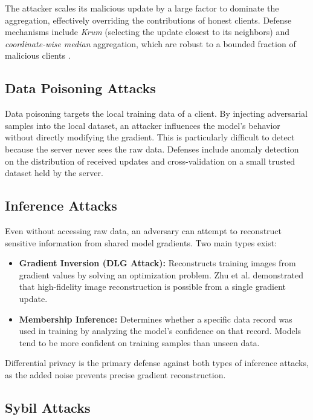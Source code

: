 \documentclass[conference]{IEEEtran}
\begin{document}
The attacker scales its malicious update by a large factor to dominate the aggregation, effectively overriding the contributions of honest clients. Defense mechanisms include \emph{Krum} (selecting the update closest to its neighbors) and \emph{coordinate-wise median} aggregation, which are robust to a bounded fraction of malicious clients \cite{pillutla2022}.

\subsection{Data Poisoning Attacks}

Data poisoning targets the local training data of a client. By injecting adversarial samples into the local dataset, an attacker influences the model's behavior without directly modifying the gradient. This is particularly difficult to detect because the server never sees the raw data. Defenses include anomaly detection on the distribution of received updates and cross-validation on a small trusted dataset held by the server.

\subsection{Inference Attacks}

Even without accessing raw data, an adversary can attempt to reconstruct sensitive information from shared model gradients. Two main types exist:

\begin{itemize}
    \item \textbf{Gradient Inversion (DLG Attack):} Reconstructs training images from gradient values by solving an optimization problem. Zhu et al. demonstrated that high-fidelity image reconstruction is possible from a single gradient update.
    \item \textbf{Membership Inference:} Determines whether a specific data record was used in training by analyzing the model's confidence on that record. Models tend to be more confident on training samples than unseen data.
\end{itemize}

Differential privacy is the primary defense against both types of inference attacks, as the added noise prevents precise gradient reconstruction.

\subsection{Sybil Attacks}
\end{document}
